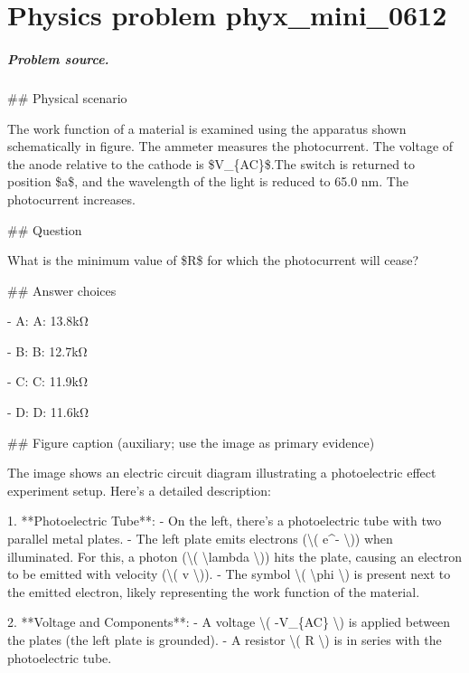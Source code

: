 
\chapter{Physics problem phyx\_mini\_0612}
\label{ch:PhyXMiniProblems_problem_phyx_mini_0612}

\paragraph{Problem source.}
\#\# Physical scenario

The work function of a material is examined using the apparatus shown schematically in figure. The ammeter measures the photocurrent. The voltage of the anode relative to the cathode is \$V\_\{AC\}\$.The switch is returned to position \$a\$, and the wavelength of the light is reduced to 65.0 nm. The photocurrent increases.

\#\# Question

What is the minimum value of \$R\$ for which the photocurrent will cease?

\#\# Answer choices

- A: A:  13.8kΩ

- B: B:  12.7kΩ

- C: C:  11.9kΩ

- D: D:  11.6kΩ

\#\# Figure caption (auxiliary; use the image as primary evidence)

The image shows an electric circuit diagram illustrating a photoelectric effect experiment setup. Here's a detailed description:

1. **Photoelectric Tube**:
   - On the left, there's a photoelectric tube with two parallel metal plates.
   - The left plate emits electrons (\textbackslash{}( e\textasciicircum{}- \textbackslash{})) when illuminated. For this, a photon (\textbackslash{}( \textbackslash{}lambda \textbackslash{})) hits the plate, causing an electron to be emitted with velocity (\textbackslash{}( v \textbackslash{})).
   - The symbol \textbackslash{}( \textbackslash{}phi \textbackslash{}) is present next to the emitted electron, likely representing the work function of the material.

2. **Voltage and Components**:
   - A voltage \textbackslash{}( -V\_\{AC\} \textbackslash{}) is applied between the plates (the left plate is grounded).
   - A resistor \textbackslash{}( R \textbackslash{}) is in series with the photoelectric tube.

